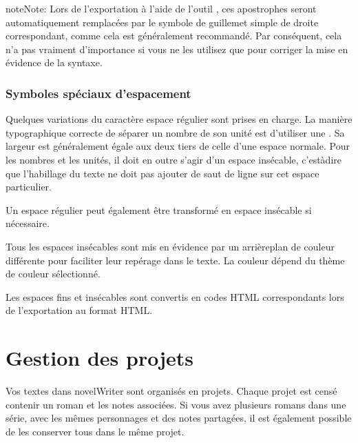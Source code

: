 \documentclass[a4paper,11pt,french]{sphinxmanual}
\begin{document}
\begin{sphinxadmonition}{note}{Note:}
\sphinxAtStartPar
Lors de l’exportation à l’aide de l’outil , ces apostrophes seront automatiquement remplacées par le symbole de guillemet simple de droite correspondant, comme cela est généralement recommandé. Par conséquent, cela n’a pas vraiment d’importance si vous ne les utilisez que pour corriger la mise en évidence de la syntaxe.
\end{sphinxadmonition}


\subsection{Symboles spéciaux d’espacement}
\label{\detokenize{usage_typography:special-space-symbols}}
\sphinxAtStartPar
Quelques variations du caractère espace régulier sont prises en charge. La manière typographique correcte de séparer un nombre de son unité est d’utiliser une . Sa largeur est généralement égale aux deux tiers de celle d’une espace normale. Pour les nombres et les unités, il doit en outre s’agir d’un espace insécable, c’est\sphinxhyphen{}à\sphinxhyphen{}dire que l’habillage du texte ne doit pas ajouter de saut de ligne sur cet espace particulier.

\sphinxAtStartPar
Un espace régulier peut également être transformé en espace insécable si nécessaire.

\sphinxAtStartPar
Tous les espaces insécables sont mis en évidence par un arrière\sphinxhyphen{}plan de couleur différente pour faciliter leur repérage dans le texte. La couleur dépend du thème de couleur sélectionné.

\sphinxAtStartPar
Les espaces fins et insécables sont convertis en codes HTML correspondants lors de l’exportation au format HTML.

\sphinxstepscope


\chapter{Gestion des projets}
\label{\detokenize{project_overview:managing-projects}}\label{\detokenize{project_overview:a-proj}}\label{\detokenize{project_overview::doc}}
\sphinxAtStartPar
Vos textes dans novelWriter sont organisés en projets. Chaque projet est censé contenir un roman et les notes associées. Si vous avez plusieurs romans dans une série, avec les mêmes personnages et des notes partagées, il est également possible de les conserver tous dans le même projet.
\end{document}
